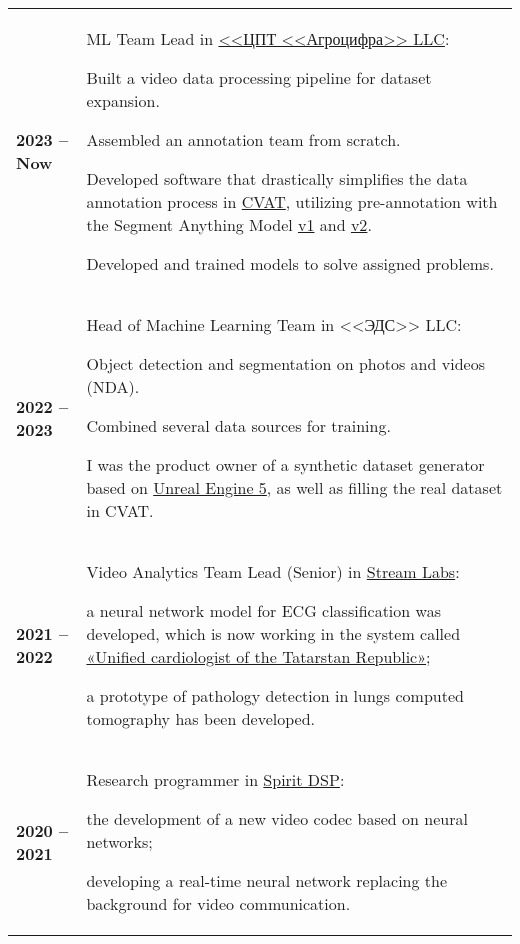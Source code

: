 \documentclass[11pt]{article}
\renewenvironment{itemize}{
	\begin{list}{\labelitemi}{
			\setlength{\topsep}{0pt}
			\setlength{\partopsep}{0pt}
			\setlength{\parskip}{0pt}
			\setlength{\parsep}{0pt}
			\setlength{\itemsep}{0pt}
		}
	}{\end{list}}
\begin{document}
	\begin{tabular} {l | p{}}
		\textbf{2023 -- Now} & ML Team Lead in \href{https://agrodigit.ru/}{<<ЦПТ <<Агроцифра>> LLC}:
		\begin{itemize}
			\item Built a video data processing pipeline for dataset expansion.
			\item Assembled an annotation team from scratch.
			\item Developed software that drastically simplifies the data annotation process in \href{https://www.cvat.ai/}{CVAT}, utilizing pre-annotation with the Segment Anything Model \href{https://segment-anything.com/}{v1} and  \href{https://sam2.metademolab.com/demo}{v2}.
			\item Developed and trained models to solve assigned problems.
		\end{itemize}\\
		\textbf{2022 -- 2023} & Head of Machine Learning Team in <<ЭДС>> LLC:
		\begin{itemize}
			\item Object detection and segmentation on photos and videos (NDA).
			\item Combined several data sources for training.
			\item I was the product owner of a synthetic dataset generator based on \href{https://www.unrealengine.com/en-US/unreal-engine-5}{Unreal Engine 5}, as well as filling the real dataset in CVAT.
		\end{itemize}\\
		\textbf{2021 -- 2022} & Video Analytics Team Lead (Senior) in \href{https://www.stream-labs.com/}{Stream Labs}:
		\begin{itemize}
			\item a neural network model for ECG classification was developed, which is now working in the system called \href{https://va1235.wixsite.com/tis-tat/edinyj-kardiolog-respubliki-tatarst}{«Unified cardiologist of the Tatarstan Republic»};
			\item a prototype of pathology detection in lungs computed tomography has been developed.
		\end{itemize}\\
		\textbf{2020 -- 2021} & Research programmer in \href{https://www.spiritdsp.com/company/}{Spirit DSP}:
		\begin{itemize}
			\item the development of a new video codec based on neural networks;
			\item developing a real-time neural network replacing the background for video communication.

\end{itemize}
\end{tabular}
\end{document}
